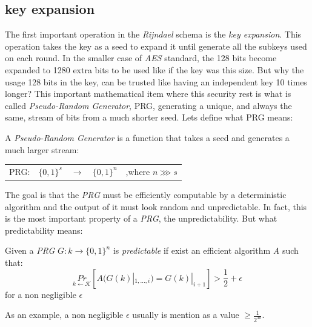 \documentclass[10pt,a4paper,twoside]{llncs}
\begin{document}
\subsection{key expansion}\label{sec:keyExpansion}
The first important operation in the \emph{Rijndael} schema is the \emph{key expansion}. This operation takes the key as a seed to expand it until generate all the subkeys used on each round. In the smaller case of \emph{AES} standard, the 128 bits become expanded to 1280 extra bits to be used like if the key was this size. But why the usage 128 bits in the key, can be trusted like having an independent key 10 times longer? This important mathematical item where this security rest is what is called \emph{Pseudo-Random Generator}, PRG, generating a unique, and always the same, stream of bits from a much shorter seed. Lets define what PRG means:

\begin{definition}\label{def:PRG}
 A \emph{Pseudo-Random Generator} is a function that takes a seed and generates a much larger stream:
 \begin{center}
  \begin{tabular}{llllr}
   PRG: & $\{0,1\}^{s}$ & $\rightarrow$ & $\{0,1\}^n$ & ,where $n \ggg s$\\
  \end{tabular}
 \end{center}
 
\end{definition}
The goal is that the \emph{PRG} must be efficiently computable by a deterministic algorithm and the output of it must look random and unpredictable. In fact, this is the most important property of a \emph{PRG}, the unpredictability. But what predictability means:

\begin{definition}\label{def:unpredictability}
 Given a \emph{PRG} $G: k \rightarrow \{0,1\}^n$ is \emph{predictable} if exist an efficient algorithm \emph{A} such that:
 \begin{equation}
  \underset{k\leftarrow\mathcal{K}}{Pr}\left[A(G(k)|_{1,...,i}) = G(k)|_{i+1}\right]>\frac{1}{2}
+\epsilon \end{equation}
 for a non negligible $\epsilon$
\end{definition}

As an example, a non negligible $\epsilon$ usually is mention as a value $\geqslant\frac{1}{2^{30}}$.
\end{document}
